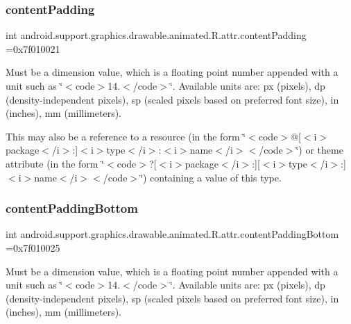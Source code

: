 \subsubsection{\texorpdfstring{content\+Padding}{contentPadding}}
{\footnotesize\ttfamily int android.\+support.\+graphics.\+drawable.\+animated.\+R.\+attr.\+content\+Padding =0x7f010021\hspace{0.3cm}{\ttfamily [static]}}

Must be a dimension value, which is a floating point number appended with a unit such as \char`\"{}$<$code$>$14.\+5sp$<$/code$>$\char`\"{}. Available units are\+: px (pixels), dp (density-\/independent pixels), sp (scaled pixels based on preferred font size), in (inches), mm (millimeters). 

This may also be a reference to a resource (in the form \char`\"{}$<$code$>$@\mbox{[}$<$i$>$package$<$/i$>$\+:\mbox{]}$<$i$>$type$<$/i$>$\+:$<$i$>$name$<$/i$>$$<$/code$>$\char`\"{}) or theme attribute (in the form \char`\"{}$<$code$>$?\mbox{[}$<$i$>$package$<$/i$>$\+:\mbox{]}\mbox{[}$<$i$>$type$<$/i$>$\+:\mbox{]}$<$i$>$name$<$/i$>$$<$/code$>$\char`\"{}) containing a value of this type. \mbox{\label{classandroid_1_1support_1_1graphics_1_1drawable_1_1animated_1_1R_1_1attr_afd240233c14457e1ef9cf950b6d59c6f}} 
\subsubsection{\texorpdfstring{content\+Padding\+Bottom}{contentPaddingBottom}}
{\footnotesize\ttfamily int android.\+support.\+graphics.\+drawable.\+animated.\+R.\+attr.\+content\+Padding\+Bottom =0x7f010025\hspace{0.3cm}{\ttfamily [static]}}

Must be a dimension value, which is a floating point number appended with a unit such as \char`\"{}$<$code$>$14.\+5sp$<$/code$>$\char`\"{}. Available units are\+: px (pixels), dp (density-\/independent pixels), sp (scaled pixels based on preferred font size), in (inches), mm (millimeters). 

